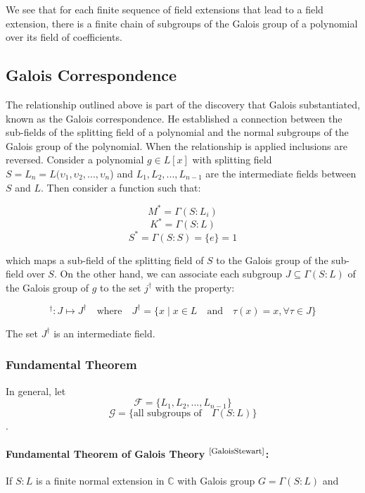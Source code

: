 \documentclass{article}
\begin{document}
\par
We see that for each finite sequence of field extensions that lead to a field extension, there is a finite chain of subgroups of the Galois group of a polynomial over its field of coefficients.

\subsection{Galois Correspondence}
The relationship outlined above is part of the discovery that Galois substantiated, known as the Galois correspondence. He established a connection between the sub-fields of the splitting field of a polynomial and the normal subgroups of the Galois group of the polynomial. When the relationship is applied inclusions are reversed. Consider a polynomial $g\in L[x]$ with splitting field $S = L_n = L(\upsilon_1,\upsilon_2,...,\upsilon_n$) and $L_1,L_2,...,L_{n-1}$ are the intermediate fields between $S$ and $L$. Then consider a function such that:

$$M^{\ast} = \Gamma(S : L_i)$$
$$K^{\ast} = \Gamma(S : L)$$
$$S^{\ast} = \Gamma(S : S) = \lbrace e \rbrace = 1$$

which maps a sub-field of the splitting field of $S$ to the Galois group of the sub-field over $S$. On the other hand, we can associate each subgroup $J\subseteq\Gamma(S: L)$ of the Galois group of $g$  to the set $j^{\dagger}$ with the property:

$$ ^{\dagger} : J \mapsto J^{\dagger} \quad \textrm{where} \quad  J^{\dagger} = \lbrace x \mid x\in L \quad \textrm{and} \quad \tau(x) = x, \forall \tau \in J\rbrace$$

The set $J^{\dagger}$ is an intermediate field.
\subsubsection{Fundamental Theorem}

In general,  let
$$\mathscr{F} = \lbrace L_1,L_2,...,L_{n-1} \rbrace$$ $$\mathscr{G} = \lbrace \textrm{all subgroups of} \quad \Gamma(S : L)  \rbrace$$.

\paragraph{Fundamental Theorem of Galois Theory $^{\textrm{\footnotesize\cite{GaloisStewart}}}$:} If $S : L$ is a finite normal extension in $\mathbb{C}$ with Galois group $G = \Gamma(S: L)$  and 
\end{document}
